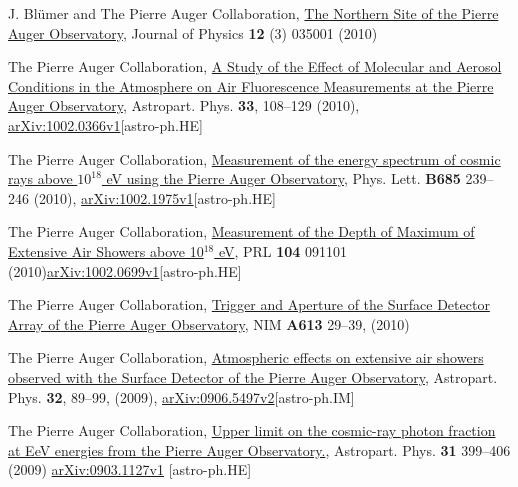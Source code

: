 \begin{etaremune}
\item {}J. Bl\"umer and The Pierre Auger Collaboration,
\href{http://dx.doi.org/10.1088/1367-2630/12/3/035001}{{The Northern Site
of the Pierre Auger Observatory}}, Journal of Physics {\bf 12} (3) 035001
(2010)

\item {}The Pierre Auger Collaboration,
\href{http://dx.doi.org/10.1016/j.astropartphys.2009.12.005}{{A Study of
the Effect of Molecular and Aerosol Conditions in the Atmosphere on Air
Fluorescence Measurements at the Pierre Auger Observatory}}, Astropart. Phys.
{\bf 33}, 108--129 (2010),
\href{http://arxiv.org/abs/0907.4282}{arXiv:1002.0366v1}[astro-ph.HE]

\item {}The Pierre Auger Collaboration,
\href{http://dx.doi.org/10.1016/j.physletb.2010.02.013}{{Measurement of
the energy spectrum of cosmic rays above $10^{18}$ eV using the Pierre Auger
Observatory}}, Phys. Lett. {\bf B685} 239--246 (2010),
\href{http://arxiv.org/abs/1002.1975}{arXiv:1002.1975v1}[astro-ph.HE]

\item {}The Pierre Auger Collaboration,
\href{http://dx.doi.org/10.1103/PhysRevLett.104.091101}{{Measurement of
the Depth of Maximum of Extensive Air Showers above 10$^{18}$ eV}}, PRL {\bf
104} 091101
(2010)\href{http://arxiv.org/abs/1002.0699}{arXiv:1002.0699v1}[astro-ph.HE]

\item {}The Pierre Auger Collaboration,
\href{http://dx.doi.org/10.1016/j.nima.2009.11.018}{{Trigger and Aperture
of the Surface Detector Array of the Pierre Auger Observatory}}, NIM {\bf A613}
29--39, (2010)

\item {} The Pierre Auger Collaboration,
\href{http://dx.doi.org/10.1016/j.astropartphys.2009.06.004}{{Atmospheric
effects on extensive air showers observed with the Surface Detector of the
Pierre Auger Observatory}}, Astropart. Phys. {\bf 32}, 89--99, (2009),
\href{http://arxiv.org/abs/0906.5497/}{arXiv:0906.5497v2}[astro-ph.IM]

\item {}The Pierre Auger Collaboration,
\href{http://dx.doi.org/10.1016/j.astropartphys.2009.04.003}{{Upper limit
on the cosmic-ray photon fraction at EeV energies from the Pierre Auger
Observatory.}}, Astropart. Phys. {\bf 31} 399--406 (2009) 
\href{http://arxiv.org/abs/0903.1127/}{arXiv:0903.1127v1} [astro-ph.HE]


\end{etaremune}
